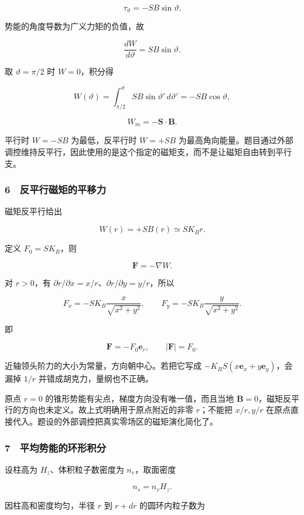 \documentclass[12pt,a4paper,fontset=fandol]{ctexart}
\begin{document}
\[\tau_\vartheta=-SB\sin\vartheta.\]

势能的角度导数为广义力矩的负值，故

\[\frac{dW}{d\vartheta}=SB\sin\vartheta.\]

取 \(\vartheta=\pi/2\) 时 \(W=0\)，积分得

\[W(\vartheta)=\int_{\pi/2}^{\vartheta}SB\sin\vartheta'\,d\vartheta'
=-SB\cos\vartheta,\]

\[\boxed{W_m=-\boldsymbol S\cdot\boldsymbol B.}\]

平行时 \(W=-SB\) 为最低，反平行时 \(W=+SB\)
为最高角向能量。题目通过外部调控维持反平行，因此使用的是这个指定的磁矩支，而不是让磁矩自由转到平行支。

\subsubsection{6　反平行磁矩的平移力}\label{ux53cdux5e73ux884cux78c1ux77e9ux7684ux5e73ux79fbux529b}

磁矩反平行给出

\[W(r)=+SB(r)\simeq SK_Br.\]

定义 \(F_0=SK_B\)，则

\[\boldsymbol F=-\nabla W.\]

对 \(r>0\)，有
\(\partial r/\partial x=x/r\)、\(\partial r/\partial y=y/r\)，所以

\[\boxed{F_x=-SK_B\frac x{\sqrt{x^2+y^2}},
\qquad F_y=-SK_B\frac y{\sqrt{x^2+y^2}}.}\]

即

\[\boxed{\boldsymbol F=-F_0\boldsymbol e_r,
\qquad |\boldsymbol F|=F_0.}\]

近轴领头阶力的大小为常量，方向朝中心。若把它写成
\(-K_BS(x\boldsymbol e_x+y\boldsymbol e_y)\)，会漏掉 \(1/r\)
并错成胡克力，量纲也不正确。

原点 \(r=0\) 的锥形势能有尖点，梯度方向没有唯一值，而且当地
\(\boldsymbol B=0\)，磁矩反平行的方向也未定义。故上式明确用于原点附近的非零
\(r\)；不能把 \(x/r,y/r\)
在原点直接代入。题设的外部调控把真实零场区的磁矩演化简化了。

\subsubsection{7　平均势能的环形积分}\label{ux5e73ux5747ux52bfux80fdux7684ux73afux5f62ux79efux5206}

设柱高为 \(H_z\)、体积粒子数密度为 \(n_v\)，取面密度

\[n_s=n_vH_z.\]

因柱高和密度均匀，半径 \(r\) 到 \(r+dr\) 的圆环内粒子数为
\end{document}
